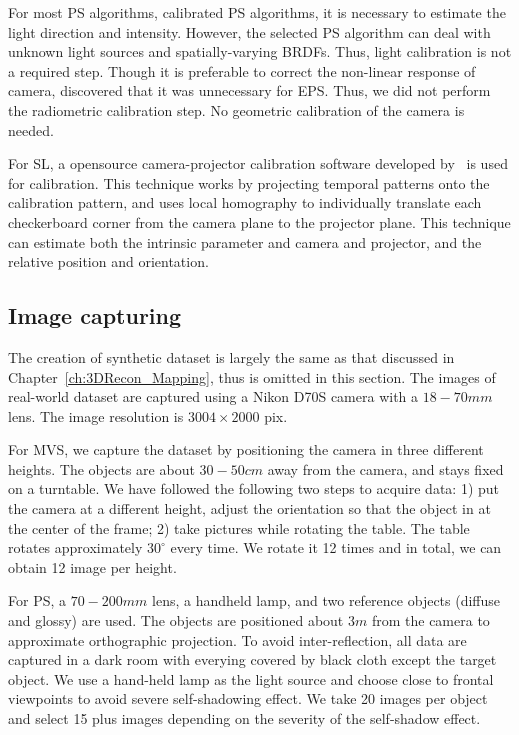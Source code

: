 For most PS algorithms, \ie calibrated PS algorithms, it is necessary to estimate the light direction and intensity. However, the selected PS algorithm can deal with unknown light sources and spatially-varying BRDFs. Thus, light calibration is not a required step. Though it is preferable to correct the non-linear response of camera, \citeauthor{hertzmann2005example} discovered that it was unnecessary for EPS. Thus, we did not perform the radiometric calibration step. No geometric calibration of the camera is needed.

For SL, a opensource camera-projector calibration software developed by~\citeauthor{moreno2012simple} is used for calibration. This technique works by projecting temporal patterns onto the calibration pattern, and uses local homography to individually translate each checkerboard corner from the camera plane to the projector plane. This technique can estimate both the intrinsic parameter and camera and projector, and the relative position and orientation.

\subsection{Image capturing}
The creation of synthetic dataset is largely the same as that discussed in Chapter~\ref{ch:3DRecon_Mapping}, thus is omitted in this section. The images of real-world dataset are captured using a Nikon D70S camera with a $18-70mm$ lens. The image resolution is $3004\times 2000$ pix.

For MVS, we capture the dataset by positioning the camera in three different heights. The objects are about $30-50cm$ away from the camera, and stays fixed on a turntable. We have followed the following two steps to acquire data: 1) put the camera at a different height, adjust the orientation so that the object in at the center of the frame; 2) take pictures while rotating the table. The table rotates approximately $30^\circ$ every time. We rotate it 12 times and in total, we can obtain 12 image per height.

For PS, a $70-200mm$ lens, a handheld lamp, and two reference objects (diffuse and glossy) are used. The objects are positioned about $3m$ from the camera to approximate orthographic projection. To avoid inter-reflection, all data are captured in a dark room with everying covered by black cloth except the target object. We use a hand-held lamp as the light source and choose close to frontal viewpoints to avoid severe self-shadowing effect. We take 20 images per object and select 15 plus images depending on the severity of the self-shadow effect.

